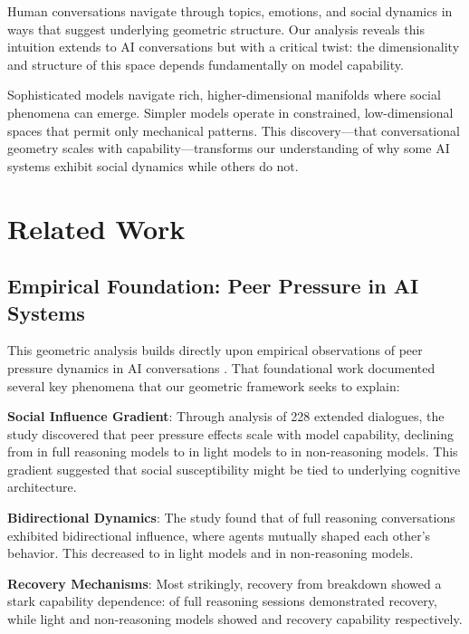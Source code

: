 \documentclass[11pt,letterpaper]{article}
\begin{document}
Human conversations navigate through topics, emotions, and social dynamics in ways that suggest underlying geometric structure. Our analysis reveals this intuition extends to AI conversations but with a critical twist: the dimensionality and structure of this space depends fundamentally on model capability.

Sophisticated models navigate rich, higher-dimensional manifolds where social phenomena can emerge. Simpler models operate in constrained, low-dimensional spaces that permit only mechanical patterns. This discovery—that conversational geometry scales with capability—transforms our understanding of why some AI systems exhibit social dynamics while others do not.

\section{Related Work}

\subsection{Empirical Foundation: Peer Pressure in AI Systems}

This geometric analysis builds directly upon empirical observations of peer pressure dynamics in AI conversations \citep{garcia2025peer}. That foundational work documented several key phenomena that our geometric framework seeks to explain:

\textbf{Social Influence Gradient}: Through analysis of 228 extended dialogues, the study discovered that peer pressure effects scale with model capability, declining from \fullReasoningPeerPressure{} in full reasoning models to \lightReasoningPeerPressure{} in light models to \nonReasoningPeerPressure{} in non-reasoning models. This gradient suggested that social susceptibility might be tied to underlying cognitive architecture.

\textbf{Bidirectional Dynamics}: The study found that \fullBidirectional{} of full reasoning conversations exhibited bidirectional influence, where agents mutually shaped each other's behavior. This decreased to \lightBidirectional{} in light models and \nonBidirectional{} in non-reasoning models.

\textbf{Recovery Mechanisms}: Most strikingly, recovery from breakdown showed a stark capability dependence: \fullReasoningRecovery{} of full reasoning sessions demonstrated recovery, while light and non-reasoning models showed \lightReasoningRecovery{} and \nonReasoningRecovery{} recovery capability respectively.
\end{document}
